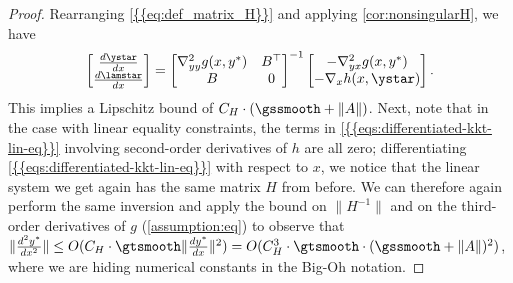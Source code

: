 
\lemYdelstarLamdelstarSmooth*
\begin{proof} 
Rearranging \cref{{{eq:def_matrix_H}}} and applying \cref{cor:nonsingularH}, we have \[
\begin{bmatrix}\frac{d\ystar}{dx}\\
\frac{d\lamstar}{dx}
\end{bmatrix}=\begin{bmatrix}\nabla^2_{yy} g(x,y^{*}) & B^{\top}\\
B & 0
\end{bmatrix}^{-1}\begin{bmatrix}-\nabla^2_{yx} g(x,y^{*})\\
-\nabla_x h(x,\ystar)
\end{bmatrix}. 
\] This implies a Lipschitz bound of $C_H \cdot (\gssmooth + \|A\|)$. 
    Next, note that in the case with linear equality constraints, the terms in  \cref{{{eqs:differentiated-kkt-lin-eq}}}  involving second-order derivatives of $h$ are all zero; differentiating \cref{{{eqs:differentiated-kkt-lin-eq}}}    with respect to $x$, we notice that the linear system we get again has the same matrix $H$ from before. We can therefore again perform the same inversion and apply the bound on $\|H^{-1}\|$ and on the third-order derivatives of $g$ (\cref{assumption:eq})
to observe that $\|\frac{d^2y^*}{dx^2}\|\leq O(C_H \cdot \gtsmooth \|\frac{dy^*}{dx}\|^2)= O(C_H^3\cdot\gtsmooth\cdot(\gssmooth+\|A\|)^2)$, where we are hiding numerical constants in the Big-Oh notation. 


\end{proof}
